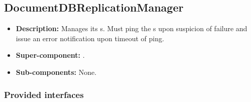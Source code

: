 \subsection{DocumentDBReplicationManager}
\begin{itemize}
    \item \textbf{Description:} Manages its s. Must ping the s upon suspicion of failure and issue an error notification upon timeout of ping.
    \item \textbf{Super-component:} .
    \item \textbf{Sub-components:} None.
\end{itemize}

\subsubsection*{Provided interfaces}
